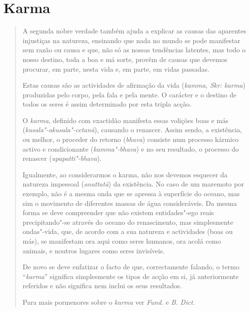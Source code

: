 \section{Karma}

\begin{quote}
  A segunda nobre verdade também ajuda a explicar as causas das aparentes
  injustiças na natureza, ensinando que nada no mundo se pode manifestar sem
  razão ou causa e que, não só as nossas tendências latentes, mas todo o nosso
  destino, toda a boa e má sorte, provêm de causas que devemos procurar, em
  parte, nesta vida e, em parte, em vidas passadas.

  Estas causas são as actividades de afirmação da vida (\emph{kamma, Skr:
    karma}) produzidas pelo corpo, pela fala e pela mente. O carácter e o
  destino de todos os seres é assim determinado por esta tripla acção.

  O \emph{karma}, definido com exactidão manifesta essas volições boas e más
  (\emph{kusala"-akusala"-cetanā}), causando o renascer. Assim sendo, a
  existência, ou melhor, o proceder do retorno (\emph{bhava}) consiste num
  processo kármico activo e condicionante (\emph{kamma"-bhava}) e no seu
  resultado, o processo do renascer (\emph{upapatti"-bhava}).

  Igualmente, ao considerarmos o karma, não nos devemos esquecer da natureza
  impessoal (\emph{anattatā}) da existência. No caso de um maremoto por exemplo,
  não é a mesma onda que se apressa à superfície do oceano, mas sim o movimento
  de diferentes massas de água consideráveis. Da mesma forma se deve compreender
  que não existem entidades"-ego reais precipitando"-se através do oceano do
  renascimento, mas simplesmente ondas"-vida, que, de acordo com a sua natureza e
  actividades (boas ou más), se manifestam ora aqui como seres humanos, ora
  acolá como animais, e noutros lugares como seres invisíveis.

  De novo se deve enfatizar o facto de que, correctamente falando, o termo
  “\emph{karma}” significa simplesmente os tipos de acção em si, já
  anteriormente referidos e não significa nem inclui os seus resultados.

  Para mais pormenores sobre o \emph{karma} ver \emph{Fund.} e \emph{B. Dict}.
\end{quote}
